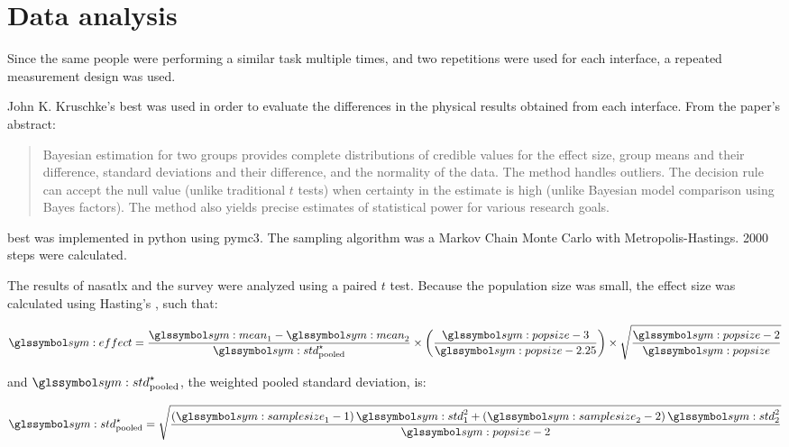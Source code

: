 \section{Data analysis}
  Since the same people were performing a similar task multiple times, and two repetitions were used for each interface, a repeated measurement design was used.
  
  John K. Kruschke's \gls{best}\cite{kruschke2013} was used in order to evaluate the differences in the physical results obtained from each interface.
  From the paper's abstract:
  
  \begin{quote}
    Bayesian estimation for two groups provides complete distributions of credible values for the effect size, group means and their difference, standard deviations and their difference, and the normality of the data.
    The method handles outliers.
    The decision rule can accept the null value (unlike traditional $t$ tests) when certainty in the estimate is high (unlike Bayesian model comparison using Bayes factors).
    The method also yields precise estimates of statistical power for various research goals.
  \end{quote}

  \gls{best} was implemented in \gls{python} using \gls{pymc3}.
  The sampling algorithm was a Markov Chain Monte Carlo with Metropolis-Hastings.
  2000 steps were calculated.

  The results of \gls{nasatlx} and the survey were analyzed using a paired $t$ test. Because the population size was small, the effect size was calculated using Hasting's , such that:

  \begin{equation}
    \sym{effect} = \frac{\sym{mean}_1 - \sym{mean}_2}{\sym{std}^\star_\mathrm{pooled}} \times \left(\frac{\sym{popsize} - 3}{\sym{popsize}-2.25}\right) \times \sqrt{\frac{\sym{popsize}-2}{\sym{popsize}}}
  \end{equation}

  \noindent and $\sym{std}^\star_\mathrm{pooled}$, the weighted pooled standard deviation, is:

  \begin{equation}
    \sym{std}^\star_\mathrm{pooled} = \sqrt{\frac{\left(\sym{samplesize}_1-1\right) \sym{std}_1^2 + \left(\sym{samplesize}_2-2\right)\sym{std}_2^2}{\sym{popsize}-2}}
  \end{equation}
